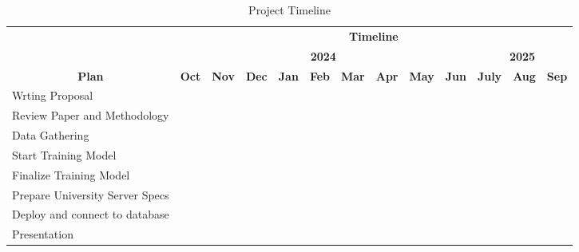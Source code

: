 \begin{table}[!ht]
	\footnotesize
	\sloppy
	\centering
	\caption{Project Timeline}
	\label{tab: your-table} %
	\begin{tabular}{|p{2.15cm}|c|c|c|c|c|c|c|c|c|c|c|c|}
		\hline
	\multicolumn{1}{|c|}{}& \multicolumn{12}{c|}{\textbf{Timeline}} \\ \cline{2-13} 
	\multicolumn{1}{|c|}{}& \multicolumn{9}{c|}{\textbf{2024}} & \multicolumn{3}{c|}{\textbf{2025}} \\ \cline{2-13} 
	\multicolumn{1}{|c|}{\multirow{-3}{2cm}{\textbf{Plan}}} & \textbf{Oct} & \textbf{Nov} & \textbf{Dec} & \textbf{Jan} & \textbf{Feb} & \textbf{Mar} & \textbf{Apr} & \textbf{May} & \textbf{Jun} & \textbf{July} & \textbf{Aug} & \textbf{Sep} \\ \hline
	Wrting Proposal &
	\cellcolor[HTML]{000000} &
	\cellcolor[HTML]{000000} & 
	\cellcolor[HTML]{000000} & & & & & & & & & \\ \hline
	Review Paper and Methodology& & &
	\cellcolor[HTML]{000000} & 
	\cellcolor[HTML]{000000} & & & & & & & &\\ \hline
	Data Gathering & &  & &
	\cellcolor[HTML]{000000} &
	\cellcolor[HTML]{000000} & & & & & & & \\ \hline
	Start Training Model & & & & &
	\cellcolor[HTML]{000000} &
	\cellcolor[HTML]{000000} &  
	\cellcolor[HTML]{000000} & & & & & \\ \hline
	Finalize  Training Model & & & & & & & &
	\cellcolor[HTML]{000000} &
	\cellcolor[HTML]{000000} & & & \\ \hline
	Prepare University Server Specs& & &  & & & & & &  
	\cellcolor[HTML]{000000} & 
	\cellcolor[HTML]{000000} & &\\ \hline
	Deploy and connect to database & & & & & & & & & & &  
	\cellcolor[HTML]{000000} & \\ \hline
	Presentation & & & & & & & & & & & & \cellcolor[HTML]{000000} \\ \hline
	
	\end{tabular}
\end{table}